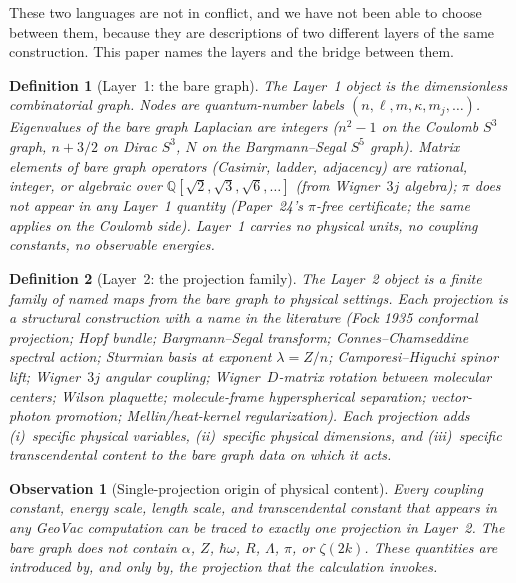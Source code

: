 \documentclass[11pt]{article}
\newtheorem{observation}{Observation}
\newtheorem{definition}{Definition}
\begin{document}
These two languages are not in conflict, and we have not been able
to choose between them, because they are descriptions of two
different layers of the same construction.  This paper names the
layers and the bridge between them.

\begin{definition}[Layer~1: the bare graph]
\label{def:layer1}
The Layer~1 object is the dimensionless combinatorial graph.  Nodes
are quantum-number labels $(n, \ell, m, \kappa, m_j, \ldots)$.
Eigenvalues of the bare graph Laplacian are integers ($n^2 - 1$ on
the Coulomb $S^3$ graph, $n + 3/2$ on Dirac $S^3$, $N$ on the
Bargmann--Segal $S^5$ graph).  Matrix elements of bare graph
operators (Casimir, ladder, adjacency) are rational, integer, or
algebraic over $\mathbb{Q}[\sqrt{2}, \sqrt{3}, \sqrt{6},\ldots]$
(from Wigner~$3j$ algebra); $\pi$ does not appear in any Layer~1
quantity (Paper~24's $\pi$-free certificate; the same applies on
the Coulomb side).  Layer~1 carries no physical units, no
coupling constants, no observable energies.
\end{definition}

\begin{definition}[Layer~2: the projection family]
\label{def:layer2}
The Layer~2 object is a finite family of named maps from the bare
graph to physical settings.  Each projection is a structural
construction with a name in the literature (Fock 1935 conformal
projection; Hopf bundle; Bargmann--Segal transform; Connes--Chamseddine
spectral action; Sturmian basis at exponent $\lambda = Z/n$;
Camporesi--Higuchi spinor lift; Wigner~$3j$ angular coupling;
Wigner~$D$-matrix rotation between molecular centers; Wilson
plaquette; molecule-frame hyperspherical separation; vector-photon
promotion; Mellin/heat-kernel regularization).  Each projection
adds (i)~specific physical variables, (ii)~specific physical
dimensions, and (iii)~specific transcendental content to the bare
graph data on which it acts.
\end{definition}

\begin{observation}[Single-projection origin of physical content]
\label{obs:single_origin}
Every coupling constant, energy scale, length scale, and
transcendental constant that appears in any GeoVac computation can
be traced to exactly one projection in Layer~2.  The bare graph
does not contain $\alpha$, $Z$, $\hbar\omega$, $R$, $\Lambda$, $\pi$,
or $\zeta(2k)$.  These quantities are introduced by, and only by,
the projection that the calculation invokes.
\end{observation}
\end{document}
